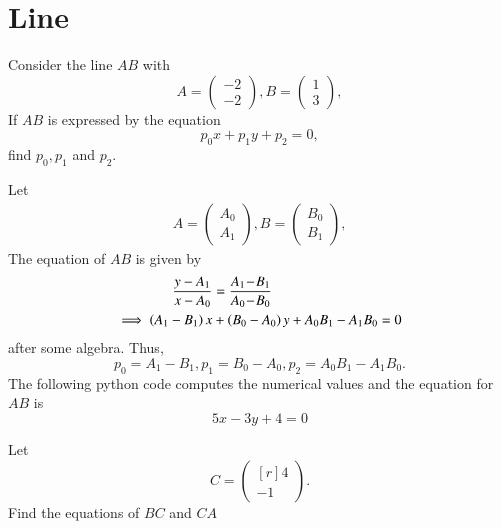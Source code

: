 \documentclass[journal,12pt,twocolumn]{IEEEtran}
\begin{document}
\section{Line}
\begin{problem}
\label{prob:line_eq}
Consider the line $AB$ with 
\begin{equation}
A =
\begin{pmatrix}
-2
\\
-2
\end{pmatrix},
B =
\begin{pmatrix}
1
\\
3
\end{pmatrix},
\end{equation}
%
If $AB$ is expressed by the equation
\begin{equation}
p_0x + p_1y + p_2 = 0,
\end{equation}
find $p_0,p_1$ and $p_2$.
\end{problem}
\solution
Let
\begin{align}
A = 
\begin{pmatrix}
A_0
\\
A_1
\end{pmatrix},
B = 
\begin{pmatrix}
B_0
\\
B_1
\end{pmatrix},
\end{align}
%
The equation of $AB$ is given by
%
\begin{align}
\label{eq:line_two_pt}
\frac{y - A_1}{x-A_0} &= \frac{A_1 \! - \! B_1}{A_0 \! - \! B_0} 
\\
\implies \left(A_1 - B_1\right)x &+ \left(B_0-A_0\right)y + A_0B_1 - A_1 B_0 = 0
\label{eq:CA}
\end{align}
%
after some algebra. Thus,
\begin{equation}
p_0 = A_1 - B_1, p_1 = B_0-A_0, p_2 = A_0B_1 - A_1 B_0.
\end{equation}
The following python code computes the numerical values and the equation for $AB$ is
\begin{equation}
5x -3y +4 = 0
\end{equation}

\begin{problem}
Let 
\begin{equation}
C =
\begin{pmatrix*}[r]
4
\\
-1
\end{pmatrix*}.
\end{equation}
%
Find the equations of $BC$ and $CA$
\end{problem}
\end{document}
